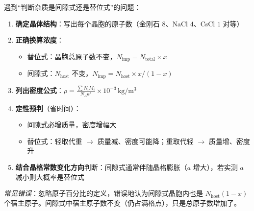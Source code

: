 \begin{thinkbox}
遇到``判断杂质是间隙式还是替位式''的问题：
\begin{enumerate}
    \item \textbf{确定晶体结构}：写出每个晶胞的原子数（金刚石 $8$、NaCl $4$、CsCl $1$ 对等）
    \item \textbf{正确换算浓度}：
    \begin{itemize}
        \item 替位式：晶胞总原子数不变，$N_{\mathrm{imp}} = N_{\mathrm{total}}\times x$
        \item 间隙式：$N_{\mathrm{host}}$ 不变，$N_{\mathrm{imp}} = N_{\mathrm{host}}\times x/(1-x)$
    \end{itemize}
    \item \textbf{列出密度公式}：$\rho = \frac{\sum N_i M_i}{N_{\!A}a^{3}}\times 10^{-3}\,\mathrm{kg/m^{3}}$
    \item \textbf{定性预判}（省时间）：
    \begin{itemize}
        \item 间隙式必增质量，密度增幅大
        \item 替位式：轻取代重 $\rightarrow$ 质量减、密度可能降；重取代轻 $\rightarrow$ 质量增、密度升
    \end{itemize}
    \item \textbf{结合晶格常数变化方向}判断：间隙式通常伴随晶格膨胀（$a$ 增大），若实测 $a$ 减小则大概率是替位式
\end{enumerate}
\textit{常见错误}：忽略原子百分比的定义，错误地认为间隙式晶胞内也是 $N_{\mathrm{host}}(1-x)$ 个宿主原子。间隙式中宿主原子数不变（仍占满格点），只是总原子数增加了。
\end{thinkbox}
